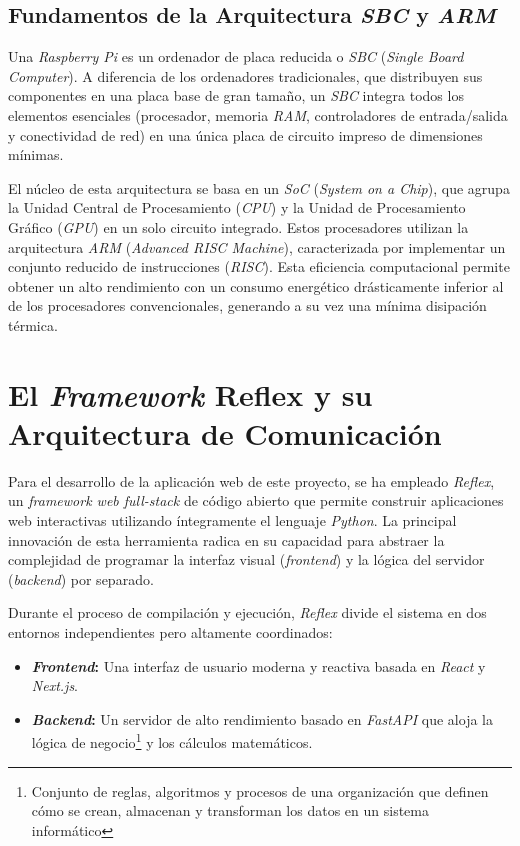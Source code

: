 \subsection{Fundamentos de la Arquitectura \textit{SBC} y \textit{ARM}}
Una \textit{Raspberry Pi} es un ordenador de placa reducida o \textit{SBC} (\textit{Single Board Computer}).  \cite{wiki:SBC} A diferencia de los ordenadores tradicionales, que distribuyen sus componentes en una placa base de gran tamaño, un \textit{SBC} integra todos los elementos esenciales (procesador, memoria \textit{RAM}, controladores de entrada/salida y conectividad de red) en una única placa de circuito impreso de dimensiones mínimas.

El núcleo de esta arquitectura se basa en un \textit{SoC} (\textit{System on a Chip}), que agrupa la Unidad Central de Procesamiento (\textit{CPU}) y la Unidad de Procesamiento Gráfico (\textit{GPU}) en un solo circuito integrado. Estos procesadores utilizan la arquitectura \textit{ARM} (\textit{Advanced RISC Machine}), caracterizada por implementar un conjunto reducido de instrucciones (\textit{RISC}). Esta eficiencia computacional permite obtener un alto rendimiento con un consumo energético drásticamente inferior al de los procesadores convencionales, generando a su vez una mínima disipación térmica. \cite{profesionalreview}

\section{El \textit{Framework} Reflex y su Arquitectura de Comunicación}
Para el desarrollo de la aplicación web de este proyecto, se ha empleado \textit{Reflex}, un \textit{framework web full-stack} de código abierto que permite construir aplicaciones web interactivas utilizando íntegramente el lenguaje \textit{Python}. La principal innovación de esta herramienta radica en su capacidad para abstraer la complejidad de programar la interfaz visual (\textit{frontend}) y la lógica del servidor (\textit{backend}) por separado. \cite{reflex} 

Durante el proceso de compilación y ejecución, \textit{Reflex} divide el sistema en dos entornos independientes pero altamente coordinados:
\begin{itemize}
    \item \textbf{\textit{Frontend}:} Una interfaz de usuario moderna y reactiva basada en \textit{React} y \textit{Next.js}.
    \item \textbf{\textit{Backend}:} Un servidor de alto rendimiento basado en \textit{FastAPI} que aloja la lógica de negocio\footnote{Conjunto de reglas, algoritmos y procesos de una organización que definen cómo se crean, almacenan y transforman los datos en un sistema informático} y los cálculos matemáticos.
\end{itemize}

